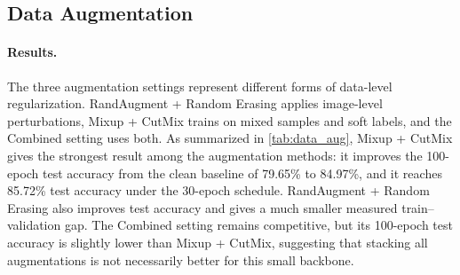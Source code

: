 \subsection{Data Augmentation}
\label{sec:augmentation}


\paragraph{Results.}

The three augmentation settings represent different forms of data-level regularization. RandAugment + Random Erasing applies image-level perturbations, Mixup + CutMix trains on mixed samples and soft labels, and the Combined setting uses both. As summarized in \cref{tab:data_aug}, Mixup + CutMix gives the strongest result among the augmentation methods: it improves the 100-epoch test accuracy from the clean baseline of 79.65\% to 84.97\%, and it reaches 85.72\% test accuracy under the 30-epoch schedule. RandAugment + Random Erasing also improves test accuracy and gives a much smaller measured train--validation gap. The Combined setting remains competitive, but its 100-epoch test accuracy is slightly lower than Mixup + CutMix, suggesting that stacking all augmentations is not necessarily better for this small backbone.


\begin{table}[!htbp]
  \centering
  \small
  \caption{Effect of different data augmentation strategies.}
  \label{tab:data_aug}
\end{table}

